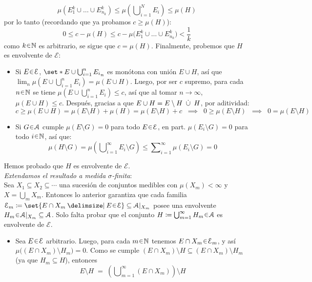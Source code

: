 \begin{sol}
\[
\mu(E^k_1\cup\dots\cup E^k_{n_k}) \le \mu\left(\bigcup\nolimits^N_{i=1} E_i\right) \leq \mu(H)
\]
por lo tanto (recordando que ya probamos $c \ge \mu(H)$):
\[
0 \leq c - \mu(H) \leq  c - \mu\bigl(E^k_1\cup\dots\cup E^k_{n_k}\bigr) < \frac{1}{k} 
\]
como $k\en\mathbb{N}$ es arbitrario, se sigue que $c = \mu(H)$. Finalmente, probemos que $H$ es envolvente de $\mathcal{E}$:
\begin{itemize}[leftmargin=1em]
\item Si $E\en\mathcal{E}$, $\set*{E\cup\bigcup^n_{i=1}E_i}_{n}$ es monótona con unión $E\cup H$, así que $\lim_{n}\mu(E\cup\bigcup^n_{i=1}E_i) = \mu(E\cup H)$. Luego, por ser $c$ supremo, para cada $n\en\mathbb{N}$ se tiene $\mu(E\cup\bigcup^n_{i=1}E_i)\leq c$, así que al tomar $n\to\infty$, $\mu(E\cup H) \leq c$. Después, gracias a que $E\cup H = E\setminus H \;\mathbin{\dot{\cup}}\; H$, por aditividad:
\[
c\ge \mu(E \cup H) = \mu(E\setminus H) + \mu(H) = \mu(E\setminus H) + c
\;\;\implies\;\;
0 \ge \mu(E\setminus H) 
\;\;\implies\;\;
0 = \mu(E\setminus H)
\]
\item Si $G\en\mathcal{A}$ cumple $\mu(E\setminus G) =0$ para todo $E\en\mathcal{E}$, en part. $\mu(E_i\setminus G) = 0$ para todo $i\en\mathbb{N}$, así que:
\[
\mu(H\setminus G) 
= \mu\left(\bigcup\nolimits^\infty_{i=1}E_i\setminus G\right)
\leq \sum\nolimits^\infty_{i=1} \mu(E_i\setminus G)
= 0
\]
\end{itemize}
Hemos probado que $H$ es envolvente de $\mathcal{E}$.\pagebreak[3]\vspace{1em}\\
\emph{Extendamos el resultado a medida $\sigma$-finita}:\\
Sea $X_1 \subseteq X_2\subseteq \cdots$ una sucesión de conjuntos medibles con $\mu(X_m) < \infty$ y $X = \bigcup_mX_m$. Entonces lo anterior garantiza que cada familia $\mathcal{E}_m \coloneq \set{E \cap X_m \given E\en\mathcal{E}} \subseteq \mathcal{A}|_{X_m}$ posee una envolvente $H_m \en \mathcal{A}|_{X_m} \subseteq \mathcal{A}$. Solo falta probar que el conjunto $H \coloneq \bigcup^\infty_{m=1} H_m \en\mathcal{A}$ es envolvente de $\mathcal{E}$.
\begin{itemize}[leftmargin=1em]
\item Sea $E\en\mathcal{E}$ arbitrario. Luego, para cada $m\en\mathbb{N}$ tenemos $E \cap X_m\en\mathcal{E}_m$, y así $\mu\bigl((E\cap X_m)\setminus H_m\bigr) = 0$. Como se cumple $(E\cap X_m)\setminus H \subseteq (E\cap X_m)\setminus H_m$ (ya que $H_m \subseteq H$), entonces
\[
E \setminus H 
\;=\; \left(\bigcup\nolimits^\infty_{m=1}(E \cap X_m)\right)\setminus H
\]
\end{itemize}
\end{sol}
